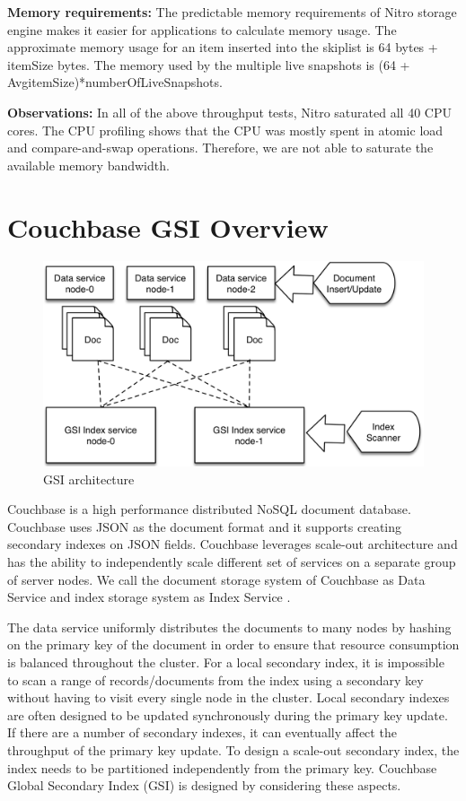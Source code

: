 \documentclass{vldb}
\begin{document}
\textbf{Memory requirements:} The predictable memory requirements of Nitro storage engine makes it easier for applications to calculate memory usage. The approximate memory usage for an item inserted into the skiplist is 64 bytes + itemSize bytes. The memory used by the multiple live snapshots is (64 + AvgitemSize)*numberOfLiveSnapshots.

\textbf{Observations:} In all of the above throughput tests, Nitro saturated all 40 CPU cores. The CPU profiling shows that the CPU was mostly spent in atomic load and compare-and-swap operations. Therefore, we are not able to saturate the available memory bandwidth.

\section{Couchbase GSI Overview}
 \begin{figure}[h]
\includegraphics[scale=0.45]{images/fig-7}
\caption{GSI architecture}
\label{fig:mvcc}
\end{figure}
Couchbase is a high performance distributed NoSQL document database. Couchbase uses JSON as the document format and it supports creating secondary indexes on JSON fields. Couchbase leverages scale-out architecture and has the ability to independently scale different set of services on a separate group of server nodes. We call the document storage system of Couchbase as Data Service and index storage system as Index Service \cite{mds}.

The data service uniformly distributes the documents to many nodes by hashing on the primary key of the document in order to ensure that resource consumption is balanced throughout the cluster. For a local secondary index, it is impossible to scan a range of records/documents from the index using a secondary key without having to visit every single node in the cluster. Local secondary indexes are often designed to be updated synchronously during the primary key update. If there are a number of secondary indexes, it can eventually affect the throughput of the primary key update. To design a scale-out secondary index, the index needs to be partitioned independently from the primary key. Couchbase Global Secondary Index (GSI) is designed by considering these aspects.
\end{document}
